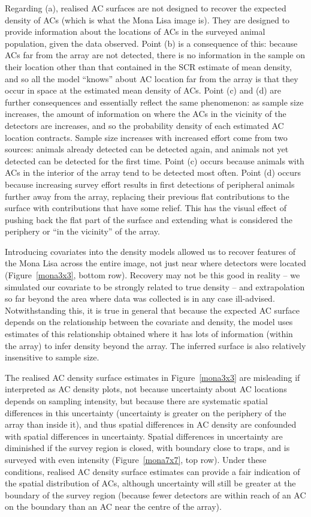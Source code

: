 \documentclass[useAMS,usenatbib,referee]{biom}
\begin{document}
Regarding (a), realised AC surfaces are not designed to recover the expected density of ACs (which is what the Mona Lisa image is). They are designed to provide information about the locations of ACs in the surveyed animal population, given the data observed. Point (b) is a consequence of this: because ACs far from the array are not detected, there is no information in the sample on their location other than that contained in the SCR estimate of mean density, and so all the model ``knows'' about AC location far from the array is that they occur in space at the estimated mean density of ACs. Point (c) and (d) are further consequences and essentially reflect the same phenomenon: as sample size increases, the amount of information on where the ACs in the vicinity of the detectors are increases, and so the probability density of each estimated AC location contracts. Sample size increases with increased effort come from two sources: animals already detected can be detected again, and animals not yet detected can be detected for the first time. Point (c) occurs because animals with ACs in the interior of the array tend to be detected most often. Point (d) occurs because increasing survey effort results in first detections of peripheral animals further away from the array, replacing their previous flat contributions to the surface with contributions that have some relief. This has the visual effect of pushing back the flat part of the surface and extending what is considered the periphery or ``in the vicinity'' of the array. 

Introducing covariates into the density models allowed us to recover features of the Mona Lisa across the entire image, not just near where detectors were located (Figure~\ref{mona3x3}, bottom row). Recovery may not be this good in reality -- we simulated our covariate to be strongly related to true density -- and extrapolation so far beyond the area where data was collected is in any case ill-advised. Notwithstanding this, it is true in general that because the expected AC surface depends on the relationship between the covariate and density, the model uses estimates of this relationship obtained where it has lots of information (within the array) to infer density beyond the array. The inferred surface is also relatively insensitive to sample size.

The realised AC density surface estimates in Figure~\ref{mona3x3} are misleading if interpreted as AC density plots, not because uncertainty about AC locations depends on sampling intensity, but because there are systematic spatial differences in this uncertainty (uncertainty is greater on the periphery of the array than inside it), and thus spatial differences in AC density are confounded with spatial differences in uncertainty. Spatial differences in uncertainty are diminished if the survey region is closed, with boundary close to traps, and is surveyed with even intensity (Figure~\ref{mona7x7}, top row). Under these conditions, realised AC density surface estimates can provide a fair indication of the spatial distribution of ACs, although uncertainty will still be greater at the boundary of the survey region (because fewer detectors are within reach of an AC on the boundary than an AC near the centre of the array). 
\end{document}
